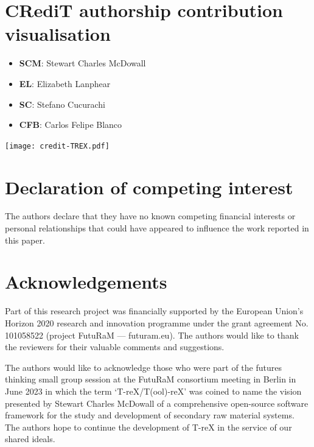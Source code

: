\documentclass[a4paper,fleqn,longmktitle]{cas-dc}
\begin{document}
\section*{CRediT authorship contribution visualisation} %

\begin{itemize}[noitemsep]
    \item \textbf{SCM}: Stewart Charles McDowall
    \item \textbf{EL}: Elizabeth Lanphear
    \item \textbf{SC}: Stefano Cucurachi
    \item \textbf{CFB}: Carlos Felipe Blanco
\end{itemize}

\texttt{[image: credit-TREX.pdf]}

\section*{Declaration of competing interest}
  The authors declare that they have no known competing financial interests or personal relationships that could have appeared to influence the work reported in this paper.

\section*{Acknowledgements}
  Part of this research project was financially supported by the European Union's Horizon 2020 research and innovation programme under the grant agreement No. 101058522 (project FutuRaM --- futuram.eu). The authors would like to thank the reviewers for their valuable comments and suggestions.

  The authors would like to acknowledge those who were part of the futures thinking small group session at the FutuRaM consortium meeting in Berlin in June 2023 in which the term `T-reX/T(ool)-reX' was coined to name the vision presented by Stewart Charles McDowall of a comprehensive open-source software framework for the study and development of secondary raw material systems. The authors hope to continue the development of T-reX in the service of our shared ideals.


\end{document}
